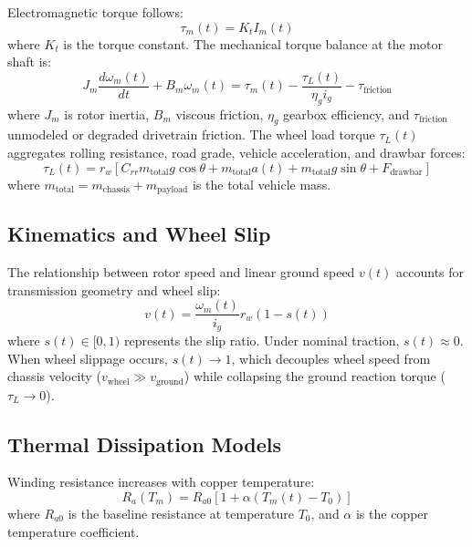 Electromagnetic torque follows:
\begin{equation}
    \tau_m(t) = K_t I_m(t)
    \label{eq:electromagnetic_torque}
\end{equation}
where $K_t$ is the torque constant. The mechanical torque balance at the motor shaft is:
\begin{equation}
    J_m \frac{d\omega_m(t)}{dt} + B_m \omega_m(t) = \tau_m(t) - \frac{\tau_L(t)}{\eta_g i_g} - \tau_{\mathrm{friction}}
    \label{eq:torque_balance}
\end{equation}
where $J_m$ is rotor inertia, $B_m$ viscous friction, $\eta_g$ gearbox efficiency, and $\tau_{\mathrm{friction}}$ unmodeled or degraded drivetrain friction. The wheel load torque $\tau_L(t)$ aggregates rolling resistance, road grade, vehicle acceleration, and drawbar forces:
\begin{equation}
    \tau_L(t) = r_w \left[ C_{rr} m_{\mathrm{total}} g \cos\theta + m_{\mathrm{total}} a(t) + m_{\mathrm{total}} g \sin\theta + F_{\mathrm{drawbar}} \right]
\end{equation}
where $m_{\mathrm{total}} = m_{\mathrm{chassis}} + m_{\mathrm{payload}}$ is the total vehicle mass.

\subsection{Kinematics and Wheel Slip}

The relationship between rotor speed and linear ground speed $v(t)$ accounts for transmission geometry and wheel slip:
\begin{equation}
    v(t) = \frac{\omega_m(t)}{i_g} r_w (1 - s(t))
\end{equation}
where $s(t) \in [0, 1)$ represents the slip ratio. Under nominal traction, $s(t) \approx 0$. When wheel slippage occurs, $s(t) \to 1$, which decouples wheel speed from chassis velocity ($v_{\mathrm{wheel}} \gg v_{\mathrm{ground}}$) while collapsing the ground reaction torque ($\tau_L \to 0$).

\subsection{Thermal Dissipation Models}

Winding resistance increases with copper temperature:
\begin{equation}
    R_a(T_m) = R_{a0} \left[ 1 + \alpha (T_m(t) - T_0) \right]
\end{equation}
where $R_{a0}$ is the baseline resistance at temperature $T_0$, and $\alpha$ is the copper temperature coefficient.

